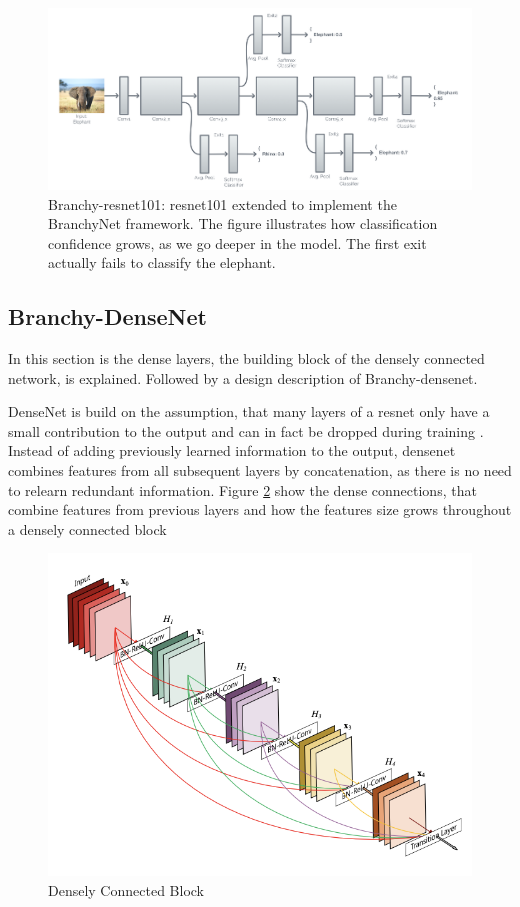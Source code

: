 \begin{figure}
	\centering
	\includegraphics[width=\linewidth]{figures/models/BResNet}
	\caption[B-\gls{resnet} architecture]{Branchy-\gls{resnet}101: \gls{resnet}101 extended to implement the BranchyNet framework. The figure illustrates how classification confidence grows, as we go deeper in the model. The first exit actually fails to classify the elephant. }
	\label{fig:b-resnet}
\end{figure}


\subsection{Branchy-DenseNet}

In this section is the dense layers, the building block of the densely connected network, is explained. Followed by a design description of Branchy-\gls{densenet}.

DenseNet \cite{huang_densely_2016} is build on the assumption, that many layers of a \gls{resnet} only have a small contribution to the output and can in fact be dropped during training \cite{huang_densely_2016}. Instead of adding previously learned information to the output, \gls{densenet} combines features from all subsequent layers by concatenation, as there is no need to relearn redundant information. Figure \ref{fig:denseblock} show the dense connections, that combine features from previous layers and how the features size grows throughout a densely connected block 

\begin{figure}
	\centering
	\includegraphics[width=.5\linewidth]{figures/models/denseblock}
	\caption[Densely Connected Block]{Densely Connected Block}
	\label{fig:denseblock}
\end{figure}

